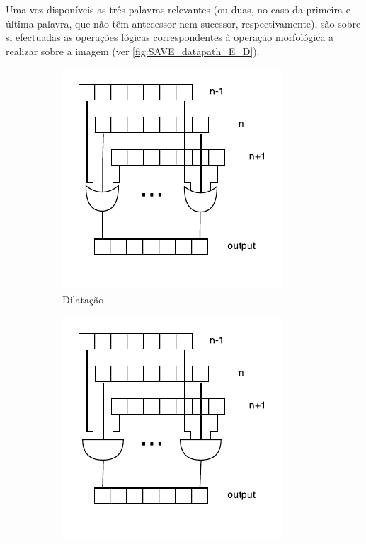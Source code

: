 \documentclass[a4paper]{article}
\begin{document}
Uma vez disponíveis as três palavras relevantes (ou duas, no caso da primeira e última palavra, que não têm antecessor nem sucessor, respectivamente), são sobre si efectuadas as operações lógicas correspondentes à operação morfológica a realizar sobre a imagem (ver \autoref{fig:SAVE_datapath_E_D}).

\begin{figure}[h]
	\centering
	\begin{subfigure}[b]{0.45\textwidth}
		\centering
		\includegraphics[width=\linewidth]{SAVE_datapath_D}
		\caption{Dilatação}
		\label{fig:SAVE_datapath_D}
	\end{subfigure}
	\begin{subfigure}[b]{0.45\textwidth}
		\centering
		\includegraphics[width=\linewidth]{SAVE_datapath_E}

\end{subfigure}
\end{figure}
\end{document}
